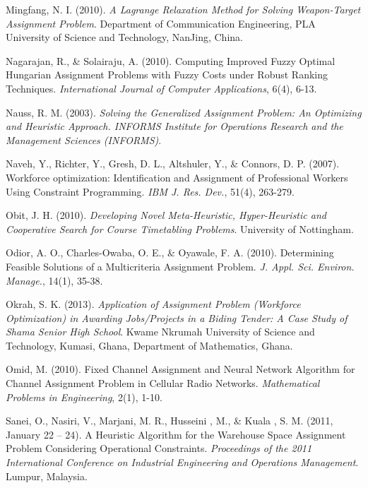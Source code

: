 \documentclass[11pt]{report}
\begin{document}
\begin{description}
		\item Mingfang, N. I. (2010). \emph{A Lagrange Relaxation Method for Solving Weapon-Target Assignment
		Problem}. Department of Communication Engineering, PLA University of Science and Technology, NanJing, China.
		
		\item Nagarajan, R., \& Solairaju, A. (2010). Computing Improved Fuzzy Optimal Hungarian
		Assignment Problems with Fuzzy Costs under Robust Ranking Techniques. \emph{International
		Journal of Computer Applications}, 6(4), 6-13.
		
		\item Nauss, R. M. (2003). \emph{Solving the Generalized Assignment Problem: An Optimizing and Heuristic Approach. INFORMS Institute for Operations Research and the Management Sciences
		(INFORMS)}.
		
		\item Naveh, Y., Richter, Y., Gresh, D. L., Altshuler, Y., \& Connors, D. P. (2007). Workforce
		optimization: Identification and Assignment of Professional Workers Using Constraint
		Programming. \emph{IBM J. Res. Dev.}, 51(4), 263-279.
		
		\item Obit, J. H. (2010). \emph{Developing Novel Meta-Heuristic, Hyper-Heuristic and Cooperative Search
		for Course Timetabling Problems}. University of Nottingham.
		
		\item Odior, A. O., Charles-Owaba, O. E., \& Oyawale, F. A. (2010). Determining Feasible Solutions of
		a Multicriteria Assignment Problem. \emph{J. Appl. Sci. Environ. Manage.}, 14(1), 35-38.
		
		\item Okrah, S. K. (2013). \emph{Application of Assignment Problem (Workforce Optimization) in Awarding Jobs/Projects in a Biding Tender: A Case Study of Shama Senior High School}. Kwame Nkrumah University of Science and Technology, Kumasi, Ghana, Department of Mathematics, Ghana. 
		
		\item Omid, M. (2010). Fixed Channel Assignment and Neural Network Algorithm for Channel
		Assignment Problem in Cellular Radio Networks. \emph{Mathematical Problems in Engineering}, 2(1), 1-10.
		
		\item Sanei, O., Nasiri, V., Marjani, M. R., Husseini , M., \& Kuala , S. M. (2011, January 22 – 24). A
		Heuristic Algorithm for the Warehouse Space Assignment Problem Considering
		Operational Constraints. \emph{Proceedings of the 2011 International Conference on Industrial
		Engineering and Operations Management}. Lumpur, Malaysia.
		

\end{description}
\end{document}
